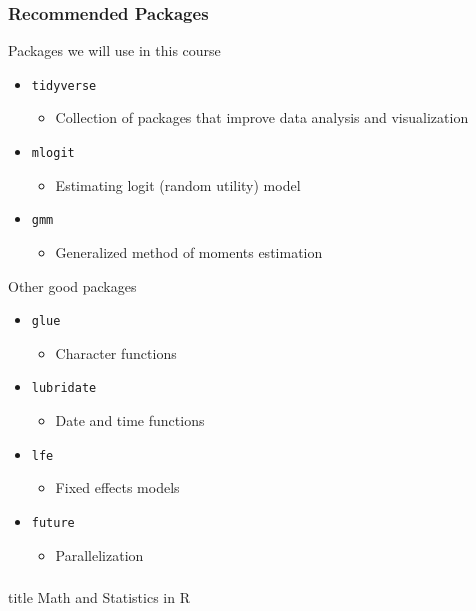 \documentclass{beamer}\usepackage[]{graphicx}\usepackage[]{color}
\begin{document}
\begin{frame}\frametitle{Recommended Packages}
    Packages we will use in this course
    \begin{itemize}
        \item \texttt{tidyverse}
        \begin{itemize}
            \item Collection of packages that improve data analysis and visualization
        \end{itemize}
        \item \texttt{mlogit}
        \begin{itemize}
            \item Estimating logit (random utility) model
        \end{itemize}
        \item \texttt{gmm}
        \begin{itemize}
            \item Generalized method of moments estimation
        \end{itemize}
    \end{itemize}
    \vspace{0.5ex}
    Other good packages
    \begin{itemize}
        \item \texttt{glue}
        \begin{itemize}
            \item Character functions
        \end{itemize}
        \item \texttt{lubridate}
        \begin{itemize}
            \item Date and time functions
        \end{itemize}
        \item \texttt{lfe}
        \begin{itemize}
            \item Fixed effects models
        \end{itemize}
        \item \texttt{future}
        \begin{itemize}
            \item Parallelization
        \end{itemize}
    \end{itemize}
\end{frame}

\begin{frame}\frametitle{}
    \vfill
    \centering
    \begin{beamercolorbox}[center]{title}
        \Large Math and Statistics in R
    \end{beamercolorbox}
    \vfill
\end{frame}
\end{document}
